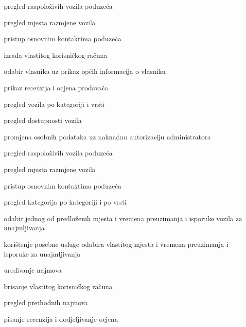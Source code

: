 			
			\begin{packed_enum}
				\item  {}
				
				\begin{packed_enum}
					
					\item pregled raspoloživih vozila poduzeća
					\item pregled mjesta razmjene vozila
					\item pristup osnovnim kontaktima poduzeća
					\item izrada vlastitog korisničkog računa
					\item odabir vlasnika uz prikaz općih informacija o vlasniku
					\item prikaz recenzija i ocjena prodavača
					\item pregled vozila po kategoriji i vrsti
					\item pregled dostupnosti vozila
					
				\end{packed_enum}
				
					\item  {}
				
				\begin{packed_enum}
					
					\item promjena osobnih podataka uz naknadnu autorizaciju administratora
					\item pregled raspoloživih vozila poduzeća
					\item pregled mjesta razmjene vozila
					\item pristup osnovnim kontaktima poduzeća
					\item pregled kategorija po kategoriji i po vrsti
					\item odabir jednog od predloženih mjesta i vremena preuzimanja i isporuke vozila za unajmljivanja
					\item korištenje posebne usluge odabira vlastitog mjesta i vremena preuzimanja i isporuke za unajmljivanja
					\item uređivanje najmova
					\item brisanje vlastitog korisničkog računa
					\item pregled prethodnih najmova
					\item pisanje recenzija i dodjeljivanje ocjena
					

\end{packed_enum}
\end{packed_enum}
